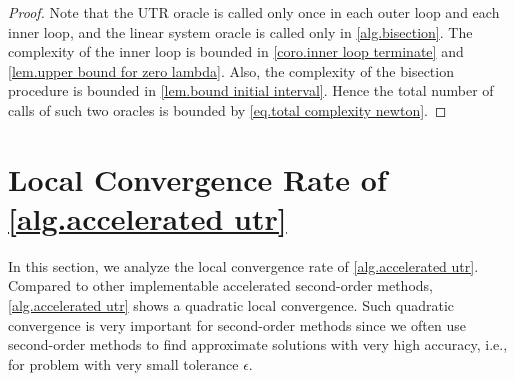 \documentclass{article}
\begin{document}
\begin{proof}
    Note that the UTR oracle is called only once in each outer loop and each inner loop, and the linear system oracle is called only in \autoref{alg.bisection}. The complexity of the inner loop is bounded in \autoref{coro.inner loop terminate} and \autoref{lem.upper bound for zero lambda}. Also, the complexity of the bisection procedure is bounded in \autoref{lem.bound initial interval}. Hence the total number of calls of such two oracles is bounded by \eqref{eq.total complexity newton}.
\end{proof}
\section{Local Convergence Rate of \autoref{alg.accelerated utr}}
\label{sec.local}
In this section, we analyze the local convergence rate of \autoref{alg.accelerated utr}. Compared to other implementable accelerated second-order methods, \autoref{alg.accelerated utr} shows a quadratic local convergence. Such quadratic convergence is very important for second-order methods since we often use second-order methods to find approximate solutions with very high accuracy, i.e., for problem with very small tolerance $\epsilon$.
\end{document}
